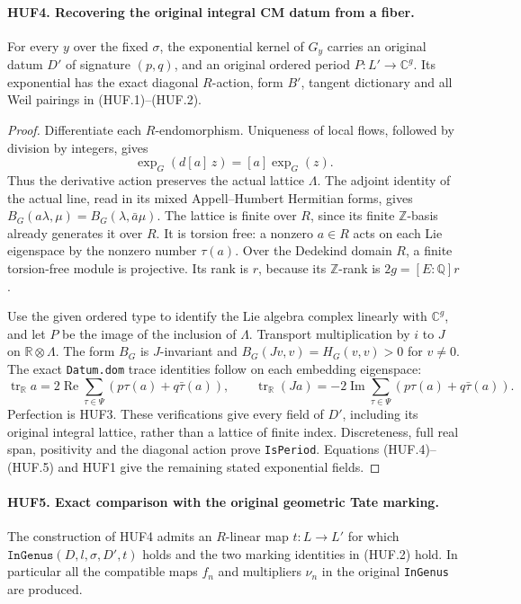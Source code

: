 \paragraph{HUF4. Recovering the original integral CM datum from a fiber.}
\label{claim:HUF4}
For every \(y\) over the fixed \(\sigma\), the exponential
kernel of \(G_y\) carries an original datum \(D'\) of
signature \((p,q)\), and an original ordered period
\(P:L'\to\mathbb C^g\).  Its exponential has the exact
diagonal \(R\)-action, form \(B'\), tangent dictionary and
all Weil pairings in (HUF.1)--(HUF.2).

\begin{proof}
Differentiate each \(R\)-endomorphism.  Uniqueness of local
flows, followed by division by integers, gives
\[
          \exp_G(d[a]\,z)=[a]\exp_G(z).
 \tag{HUF.5}
\]
Thus the derivative action preserves the actual lattice
\(\Lambda\).  The adjoint identity of the actual line, read
in its mixed Appell--Humbert Hermitian forms, gives
\(B_G(a\lambda,\mu)=B_G(\lambda,\bar a\mu)\).
The lattice is finite over \(R\), since its finite
\(\mathbb Z\)-basis already generates it over \(R\).
It is torsion free: a nonzero \(a\in R\) acts on each Lie
eigenspace by the nonzero number \(\tau(a)\).
Over the Dedekind domain \(R\), a finite torsion-free module
is projective.  Its rank is \(r\), because its
\(\mathbb Z\)-rank is \(2g=[E:\mathbb Q]r\).

Use the given ordered type to identify the Lie algebra
complex linearly with \(\mathbb C^g\), and let \(P\) be
the image of the inclusion of \(\Lambda\).
Transport multiplication by \(i\) to \(J\) on
\(\mathbb R\otimes\Lambda\).  The form \(B_G\) is
\(J\)-invariant and \(B_G(Jv,v)=H_G(v,v)>0\) for
\(v\ne0\).  The exact \texttt{Datum.dom} trace identities
follow on each embedding eigenspace:
\[
 \operatorname{tr}_{\mathbb R}a
   =2\operatorname{Re}\sum_{\tau\in\Psi}
                       (p\tau(a)+q\bar\tau(a)),\qquad
 \operatorname{tr}_{\mathbb R}(Ja)
   =-2\operatorname{Im}\sum_{\tau\in\Psi}
                       (p\tau(a)+q\bar\tau(a)).
\]
Perfection is HUF3.  These verifications give every field
of \(D'\), including its original integral lattice, rather
than a lattice of finite index.  Discreteness, full real
span, positivity and the diagonal action prove
\texttt{IsPeriod}.  Equations (HUF.4)--(HUF.5) and HUF1
give the remaining stated exponential fields.
\end{proof}

\paragraph{HUF5. Exact comparison with the original geometric Tate marking.}
\label{claim:HUF5}
The construction of HUF4 admits an \(R\)-linear map
\(t:L\to L'\) for which
\(\texttt{InGenus}(D,l,\sigma,D',t)\) holds and the two
marking identities in (HUF.2) hold.  In particular all
the compatible maps \(f_n\) and multipliers \(\nu_n\)
in the original \texttt{InGenus} are produced.


